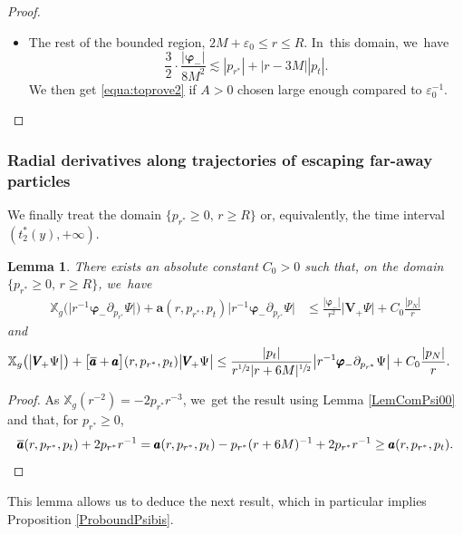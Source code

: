 \documentclass[JEP,XML,SOM,Unicode,published]{cedram}
\let\epsilon\varepsilon
\theoremstyle{plain}
\newtheorem{lemma}[proposition]{Lemma}
\theoremstyle{definition}
\newcommand\T{{\mathbb{X}}}
\begin{document}
\begin{proof}
\begin{itemize}
\begin{align*}
\frac{|\pmb{\varphi}_-|}{8M^2}& \leq \frac{2r|p_u|}{8M^2 \Omega^2}+ \frac{1}{8M^2} \cdot\frac{27M^2r^{\sfrac{1}{2}} |p_t|}{r^{\sfrac{3}{2}}-|r+6M|^{\sfrac{1}{2}}(r-3M)} \\
& \leq \Big|1+\frac{\epsilon_0}{2M}\Big|^3 \cdot \frac{2M|p_u|}{r^2 \Omega^2}+\frac{c_0}{2}A|r-3M||p_t|,
\end{align*}
provided that $A>0$ is large enough. We~get \eqref{equa:toprove2} if $\epsilon_0$ is small enough so that $\frac{3}{2}\big|1+\sfrac{\epsilon_0}{2M}\big|^3\leq 2$.
\item The rest of the bounded region, $2M+\epsilon_0 \leq r \leq R$. In~this domain, we~have
\[
\frac{3}{2} \cdot \frac{|\pmb{\varphi}_-|}{8M^2} \lesssim |p_{r^*}|+|r-3M||p_t|.
\]
We then get \eqref{equa:toprove2} if $A>0$ chosen large enough compared to $\epsilon_0^{-1}$.\qedhere
\end{itemize}
\end{proof}

\subsubsection{Radial derivatives along trajectories of escaping far-away particles}

We finally treat the domain $\{ p_{r^*} \geq 0, \, r \geq R \}$ or, equivalently, the time interval $(t_2^*(y),+\infty)$.

\begin{lemma}\label{LemComPsi000}
There exists an absolute constant $C_0 >0$ such that, on the domain $\{ p_{r^*} \geq 0, \, r \geq R \}$, we~have
\begin{align*}
\T_g \bigl(\big| r^{-1} \pmb{\varphi}_- \partial_{p_{r^*}} \Psi \big| \bigr) +\pmb{a} (r,p_{r^*},p_t) \big| r^{-1} \pmb{\varphi}_- \partial_{p_{r^*}} \Psi \big| & \leq \frac{|\pmb{\varphi}_-|}{r^2} \big| \pmb{V}_{\! +} \Psi \big|+C_0\frac{|p_N|}{r}
\end{align*}
and
\begin{align*}
\T_g \bigl(\big| \pmb{V}_{\! +} \Psi \big| \bigr) + \bigl[\overline{\pmb{a}} + \pmb{a} \bigr](r,p_{r^*},p_t) \big| \pmb{V}_{\! +} \Psi \big| & \leq \frac{|p_t|}{r^{\sfrac{1}{2}}|r+6M|^{\sfrac{1}{2}}}\big| r^{-1} \pmb{\varphi}_- \partial_{p_{r^*}}\Psi \big|+C_0\frac{|p_N|}{r}.
\end{align*}
\end{lemma}
\begin{proof}
As $\T_g(r^{-2})=-2p_{r^*}r^{-3} $, we~get the result using Lemma \ref{LemComPsi00} and that, for $p_{r^*} \geq 0$,
\[
\overline{\pmb{a}} (r,p_{r^*},p_t)+2p_{r^*}r^{-1}=\pmb{a}(r,p_{r^*},p_t)-p_{r^*}(r+6M)^{-1}+2p_{r^*}r^{-1} \geq \pmb{a}(r,p_{r^*},p_t).\qedhere
\]
\end{proof}
This lemma allows us to deduce the next result, which in particular implies Proposition \ref{ProboundPsibis}.
\end{document}
